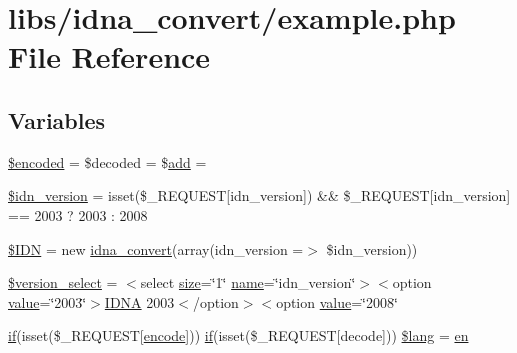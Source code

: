 \hypertarget{example_8php}{}\section{libs/idna\+\_\+convert/example.php File Reference}
\label{example_8php}
\subsection*{Variables}
\begin{DoxyCompactItemize}
\item 
\hyperlink{example_8php_af709b460501204e2ec7e34e96e7de576}{\$encoded} = \$decoded = \$\hyperlink{common_2js_2jquery_8js_a638fd10c6d2f5e258459b1abfa3b94ea}{add} = \textquotesingle{}\textquotesingle{}
\item 
\hyperlink{example_8php_aaa64132973e10962c52265cfbee1cb9c}{\$idn\+\_\+version} = isset(\$\+\_\+\+R\+E\+Q\+U\+E\+ST\mbox{[}\textquotesingle{}idn\+\_\+version\textquotesingle{}\mbox{]}) \&\& \$\+\_\+\+R\+E\+Q\+U\+E\+ST\mbox{[}\textquotesingle{}idn\+\_\+version\textquotesingle{}\mbox{]} == 2003 ? 2003 \+: 2008
\item 
\hyperlink{example_8php_aa45ac61e5ada434ea385befcd1aea16d}{\$\+I\+DN} = new \hyperlink{classidna__convert}{idna\+\_\+convert}(array(\textquotesingle{}idn\+\_\+version\textquotesingle{} =$>$ \$idn\+\_\+version))
\item 
\hyperlink{example_8php_a13d9753a348e3a016c3d8fb1ac173bbd}{\$version\+\_\+select} = \textquotesingle{}$<$select \hyperlink{jquery-1_8x_8js_afa6806c6ee5e63d5177f1dcc082ba6bc}{size}=\char`\"{}1\char`\"{} \hyperlink{common_8js_a22c29d2aa8ed6161ce8faa718ef76e68}{name}=\char`\"{}idn\+\_\+version\char`\"{}$>$$<$option \hyperlink{common_2js_2jquery_8js_abe5393d870043cf6aaa1d5ad5fce755c}{value}=\char`\"{}2003\char`\"{}$>$\hyperlink{ReadMe_8txt_a5d4f4ee07624e2d22494ccae4cc77d48}{I\+D\+NA} 2003$<$/option$>$$<$option \hyperlink{common_2js_2jquery_8js_abe5393d870043cf6aaa1d5ad5fce755c}{value}=\char`\"{}2008\char`\"{}\textquotesingle{}
\item 
\hyperlink{menu_2tpl_2js_2jquery_8jstree_8js_acba95bef569cfaee32c4ed0212b2bb92}{if}(isset(\$\+\_\+\+R\+E\+Q\+U\+E\+ST\mbox{[}\textquotesingle{}\hyperlink{ReadMe_8txt_a7fcb4e5f2b1b63096ccac2903dfbef97}{encode}\textquotesingle{}\mbox{]})) \hyperlink{menu_2tpl_2js_2jquery_8jstree_8js_acba95bef569cfaee32c4ed0212b2bb92}{if}(isset(\$\+\_\+\+R\+E\+Q\+U\+E\+ST\mbox{[}\textquotesingle{}decode\textquotesingle{}\mbox{]})) \hyperlink{example_8php_aef99014231eb219a8c774eb4b8463fd9}{\$lang} = \textquotesingle{}\hyperlink{jquery-1_8x_8min_8js_a5d7a777130eac935addcf4926a74b23c}{en}\textquotesingle{}

\end{DoxyCompactItemize}
